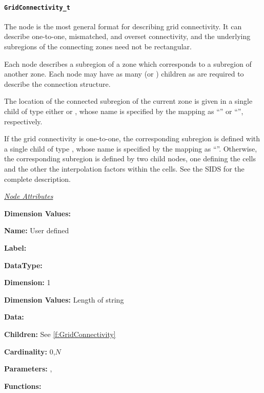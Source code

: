 \paragraph{\texttt{GridConnectivity\_t}}
\label{s:GridConnectivity}

The  node is the most general format for
describing grid connectivity. It can describe one-to-one, mismatched,
and overset connectivity, and the underlying subregions of the
connecting zones need not be rectangular.

Each  node describes a subregion
of a zone which corresponds to a subregion of another
zone. Each  node may have as many
 (or ) children
as are required to describe the connection structure.

The location of the connected subregion of the current zone is
given in a single child of type either  or
, whose name is specified by the mapping as
``'' or ``'', respectively.

If the grid connectivity is one-to-one, the corresponding subregion is
defined with a single child of type , whose name is
specified by the mapping as ``''.  Otherwise, the
corresponding subregion is defined by two child nodes, one defining the
cells and the other the interpolation factors within the cells.
See the SIDS for the complete description.

\textit{\uline{Node Attributes}}
\begin{Ventryic}{\textbf{Dimension Values:}}
\item [\textbf{Name:}]
      User defined
\item [\textbf{Label:}]
\item [\textbf{DataType:}]
\item [\textbf{Dimension:}]
      1
\item [\textbf{Dimension Values:}]
      Length of string
\item [\textbf{Data:}]
\item [\textbf{Children:}]
      See \autoref{f:GridConnectivity}
\item [\textbf{Cardinality:}]
      0,$N$
\item [\textbf{Parameters:}]
      , 
\item [\textbf{Functions:}]
\end{Ventryic}


